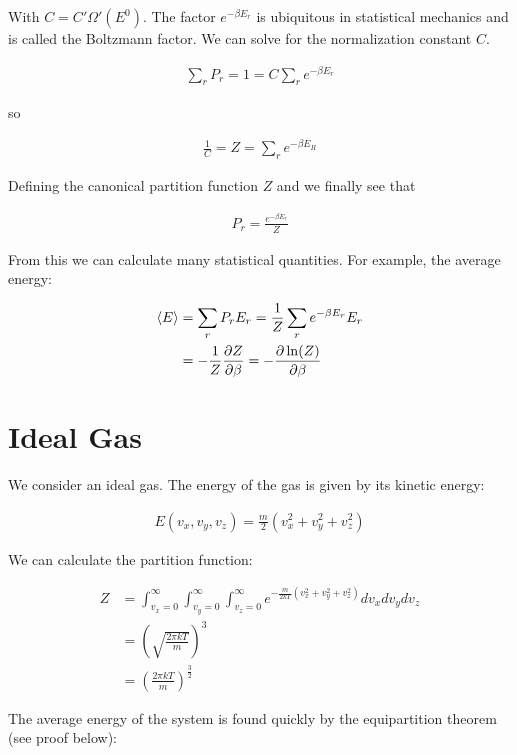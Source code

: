 \documentclass[12pt]{article}
\begin{document}
With $C = C'\Omega'(E^0)$. The factor $e^{-\beta E_r}$ is ubiquitous in statistical mechanics and is called the Boltzmann factor. We can solve for the normalization constant $C$.

\begin{align}
\sum_r P_r = 1 = C \sum_r e^{-\beta E_r}
\end{align}

so 

\begin{align}
\frac{1}{C} = Z = \sum_r e^{-\beta E_R}
\end{align}

Defining the canonical partition function $Z$
and we finally see that

\begin{align}
P_r = \frac{e^{-\beta E_r}}{Z}
\end{align}

From this we can calculate many statistical quantities. For example, the average energy:

\begin{align}
\braket{E} &= \sum_r P_r E_r = \frac{1}{Z} \sum_r e^{-\beta E_r} E_r\\
&= -\frac{1}{Z} \frac{\partial Z}{\partial \beta} = -\frac{\partial \ln(Z)}{\partial \beta}
\end{align}

\section{Ideal Gas}

We consider an ideal gas. The energy of the gas is given by its kinetic energy:

\begin{align}
E(v_x,v_y,v_z) = \frac{m}{2} (v_x^2 + v_y^2 + v_z^2)
\end{align}

We can calculate the partition function:

\begin{align}
Z &= \int_{v_x=0}^{\infty}\int_{v_y=0}^{\infty} \int_{v_z=0}^{\infty} e^{-\frac{m}{2 k T} (v_x^2 + v_y^2+ v_z^2)} dv_x dv_y dv_z\\
&= \left(\sqrt{\frac{2\pi k T}{m}}\right)^3\\ 
&= \left(\frac{2\pi  k T}{m}\right)^{\frac{3}{2}}
\end{align}

The average energy of the system is found quickly by the equipartition theorem (see proof below):
\end{document}

